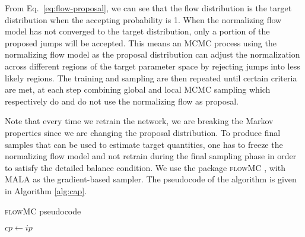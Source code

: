 \documentclass[twocolumn]{aastex631}
\begin{document}
From Eq.~\eqref{eq:flow-proposal}, we can see that the flow distribution is the
target distribution when the accepting probability is 1. When the normalizing
flow model has not converged to the target distribution, only a portion of the
proposed jumps will be accepted. This means an MCMC process using the
normalizing flow model as the proposal distribution can adjust the
normalization across different regions of the target parameter space by
rejecting jumps into less likely regions. The training and sampling are then
repeated until certain criteria are met, at each step combining global and
local MCMC sampling which respectively do and do not use the normalizing flow
as proposal.

Note that every time we retrain the network, we are breaking the Markov
properties since we are changing the proposal distribution. To produce final
samples that can be used to estimate target quantities, one has to freeze the
normalizing flow model and not retrain during the final sampling phase in order
to satisfy the detailed balance condition. We use the package \textsc{flowMC}
\citep{2022arXiv221106397W,Gabrie:2021tlu}, with MALA as the gradient-based sampler. The
pseudocode of the algorithm is given in Algorithm \ref{alg:cap}.

\begin{algorithm}
\caption{\textsc{flowMC} pseudocode}\label{alg:cap}
$cp \leftarrow ip$\\

\end{algorithm}
\end{document}
